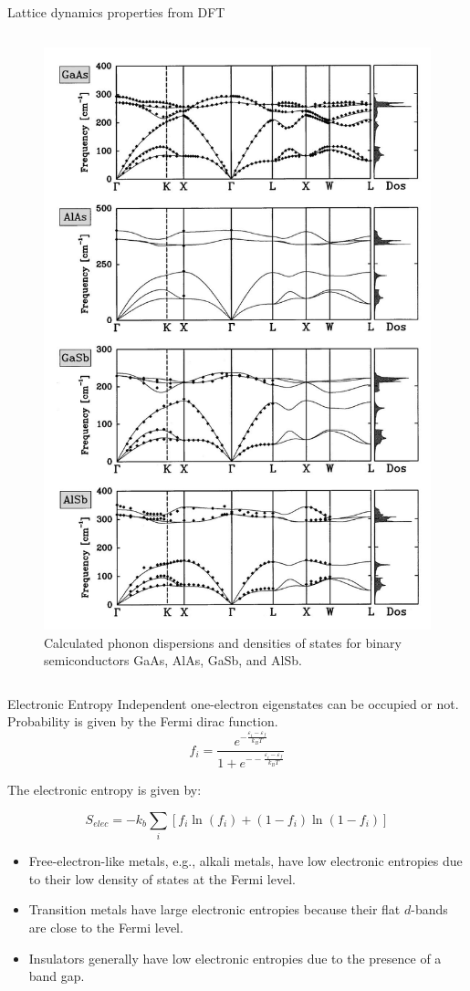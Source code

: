 \documentclass[aspectratio=169]{beamer}
\begin{document}
\begin{frame}{Lattice dynamics properties from DFT}
\begin{columns}
            \begin{figure}
                \centering
                \includegraphics[width=0.45\linewidth]{lectures/figures/10_Phonon_Semiconductors.png}
                \caption{Calculated phonon dispersions and densities of states for binary semiconductors GaAs, AlAs, GaSb, and AlSb.\cite{baroniPhononsRelatedCrystal2001}}

            \end{figure}

        \end{columns}

    \end{frame}

    \begin{frame}{Electronic Entropy}
        Independent one-electron eigenstates can be occupied or not. Probability is given by the Fermi dirac function.
        \begin{equation*}
            f_i = \frac{e^{-\frac{\varepsilon_i-\varepsilon_f}{k_BT}}}{1+e^{--\frac{\varepsilon_i-\varepsilon_f}{k_BT}}}
        \end{equation*}

        The electronic entropy is given by:

        \begin{equation*}
            S_{elec} = -k_b \sum_i \left[ f_i \ln(f_i) + (1-f_i) \ln(1-f_i)\right]
        \end{equation*}

        \begin{itemize}
            \item Free-electron-like metals, e.g., alkali metals, have low electronic entropies due to their low density of states at the Fermi level.
            \item Transition metals have large electronic entropies because their flat $d$-bands are close to the Fermi level.
            \item Insulators generally have low electronic entropies due to the presence of a band gap.
        \end{itemize}
    \end{frame}
\end{document}

